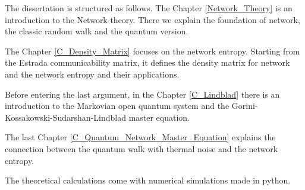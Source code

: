 The dissertation is structured as follows.
The Chapter \ref{Network_Theory} is an introduction to the Network theory. There we explain the foundation of network, the classic random walk and the quantum version.

The Chapter \ref{C_Density_Matrix} focuses on the network entropy. Starting from the Estrada communicability matrix, it defines the density matrix for network and the network entropy and their applications.

Before entering the last argument, in the Chapter \ref{C_Lindblad} there is an introduction to the Markovian open quantum system and the Gorini-Kossakowski-Sudarshan-Lindblad master equation. 

The last Chapter \ref{C_Quantum_Network_Master_Equation} explains the connection between the quantum walk with thermal noise and the network entropy.

The theoretical calculations come with numerical simulations made in python.